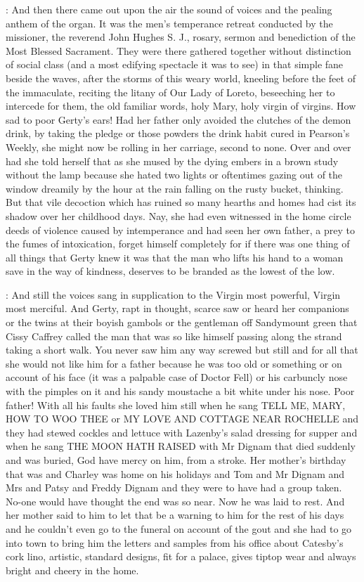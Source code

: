 :
And then there came out upon the air the sound of voices and the
pealing anthem of the organ. It was the men's temperance retreat conducted
by the missioner, the reverend John Hughes S. J., rosary, sermon and
benediction of the Most Blessed Sacrament. They were there gathered
together without distinction of social class (and a most edifying
spectacle it was to see) in that simple fane beside the waves,
after the storms of this weary world, kneeling before the feet of
the immaculate, reciting the litany of Our Lady of Loreto,
beseeching her to intercede for them, the old familiar words,
holy Mary, holy virgin of virgins. How sad to poor Gerty's ears!
Had her father only avoided the clutches of the demon drink, by
taking the pledge or those powders the drink habit cured in Pearson's
Weekly, she might now be rolling in her carriage, second to none. Over and
over had she told herself that as she mused by the dying embers in a brown
study without the lamp because she hated two lights or oftentimes gazing
out of the window dreamily by the hour at the rain falling on the rusty
bucket, thinking. But that vile decoction which has ruined so many hearths
and homes had cist its shadow over her childhood days. Nay, she had even
witnessed in the home circle deeds of violence caused by intemperance and
had seen her own father, a prey to the fumes of intoxication, forget
himself completely for if there was one thing of all things that Gerty
knew it was that the man who lifts his hand to a woman save in the way of
kindness, deserves to be branded as the lowest of the low.

:
And still the voices sang in supplication to the Virgin most powerful,
Virgin most merciful. And Gerty, rapt in thought, scarce saw or heard her
companions or the twins at their boyish gambols or the gentleman off
Sandymount green that Cissy Caffrey called the man that was so like
himself passing along the strand taking a short walk. You never saw him
any way screwed but still and for all that she would not like him for a
father because he was too old or something or on account of his face (it
was a palpable case of Doctor Fell) or his carbuncly nose with the pimples
on it and his sandy moustache a bit white under his nose. Poor father!
With all his faults she loved him still when he sang TELL ME, MARY, HOW TO
WOO THEE or MY LOVE AND COTTAGE NEAR ROCHELLE and they had stewed cockles
and lettuce with Lazenby's salad dressing for supper and when he sang THE
MOON HATH RAISED with Mr Dignam that died suddenly and was buried, God
have mercy on him, from a stroke. Her mother's birthday that was and
Charley was home on his holidays and Tom and Mr Dignam and Mrs and
Patsy and Freddy Dignam and they were to have had a group taken.
No-one would have thought the end was so near. Now he was laid to rest.
And her mother said to him to let that be a warning to him for the rest of
his days and he couldn't even go to the funeral on account of the gout and
she had to go into town to bring him the letters and samples from his
office about Catesby's cork lino, artistic, standard designs, fit for a
palace, gives tiptop wear and always bright and cheery in the home.

